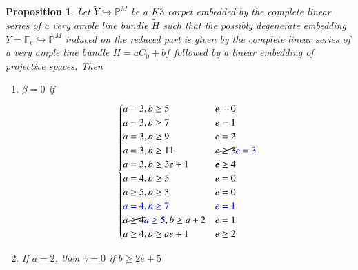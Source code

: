 \documentclass[11pt,twoside]{amsart}
\theoremstyle{plain}
\numberwithin{equation}{section}
\newtheorem{proposition}[theorem]{Proposition}
\theoremstyle{definition}
\begin{document}
\begin{proposition}\label{calculating beta}
Let $\widetilde{Y} \hookrightarrow \mathbb{P}^M$ be a $K3$ carpet embedded by the complete linear series of a very ample line bundle $\widetilde{H}$ such that the possibly degenerate embedding $Y = \mathbb{F}_e \hookrightarrow \mathbb{P}^M$ induced on the reduced part is given by the complete linear series of a very ample line bundle $H = aC_0+bf$ followed by a linear embedding of projective spaces.   
Then 

\begin{enumerate}
    \item $\beta = 0$ if
    \[
\begin{cases}
    a = 3, b \geq 5 & e = 0  \\
    a = 3, b \geq 7 & e = 1  \\
    a = 3, b \geq 9 & e = 2  \\
\color{black}
    a = 3, b \geq 11 & \cancel{e \geq 3} \textcolor{blue}{e = 3} \\
    a = 3, b \geq 3e+1 & e \geq 4 \\
\color{black}
    a = 4, b \geq 5 & e = 0 \\
    a \geq 5, b \geq 3 & e = 0 \\
    \textcolor{blue}{a = 4, b \geq 7} & \textcolor{blue}{e = 1} \\
    \cancel{a \geq 4} \textcolor{blue}{a \geq 5}, b \geq a+2 & e = 1 \\
    a \geq 4, b \geq ae+1 & e \geq 2 \\
    
\end{cases}
  \]

  \item If $a = 2$, then $\gamma = 0$ if $b \geq 2e+5$



\end{enumerate}
  

 


\end{proposition}
 
\end{document}
